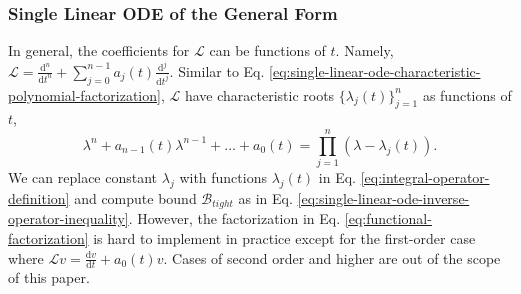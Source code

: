 \documentclass{uai2023}
\newcommand{\Bound}{\mathcal{B}}
\renewcommand{\L}{\mathcal{L}}
\begin{document}
\subsubsection{Single Linear ODE of the General Form}
   In general, the coefficients for $\L$ can be functions of $t$. Namely, $\L = \frac{\mathrm d^n}{\mathrm d t^n} +  \sum_{j=0}^{n-1}a_j(t)\frac{\mathrm d^j}{\mathrm d t^j}$.
   Similar to Eq. \ref{eq:single-linear-ode-characteristic-polynomial-factorization}, $\L$ have characteristic roots $\{\lambda_{j}(t)\}_{j=1}^{n}$ as functions of $t$,
    {
        \small
        \begin{equation*} \label{eq:functional-factorization}
            \lambda^n + a_{n-1}(t)\lambda^{n-1} + \dots + a_0(t) = \prod_{j=1}^{n}(\lambda - \lambda_j(t)).
        \end{equation*}
    }
    We can replace constant $\lambda_j$ with functions $\lambda_j(t)$ in Eq. \ref{eq:integral-operator-definition} and compute bound $\Bound_{tight}$ as in Eq. \ref{eq:single-linear-ode-inverse-operator-inequality}.
    However, the factorization in Eq. \ref{eq:functional-factorization} is hard to implement in practice except for the first-order case  where $\L v = \frac{\mathrm{d}v}{\mathrm{d}t} + a_0(t)v$. 
    Cases of second order and higher are out of the scope of this paper.
\end{document}
